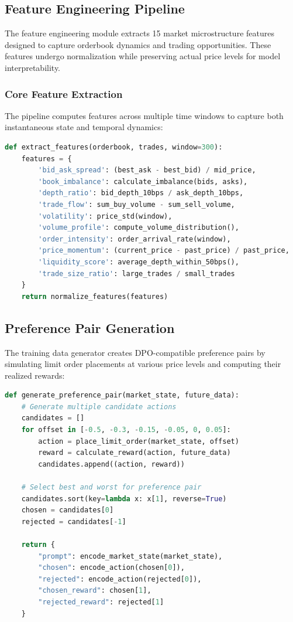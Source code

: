 \documentclass{report}
\begin{document}
\subsection{Feature Engineering Pipeline}

The feature engineering module extracts 15 market microstructure features designed to capture orderbook dynamics and trading opportunities. These features undergo normalization while preserving actual price levels for model interpretability.

\subsubsection{Core Feature Extraction}

The pipeline computes features across multiple time windows to capture both instantaneous state and temporal dynamics:

\begin{lstlisting}[language=Python, caption=Feature extraction implementation]
def extract_features(orderbook, trades, window=300):
    features = {
        'bid_ask_spread': (best_ask - best_bid) / mid_price,
        'book_imbalance': calculate_imbalance(bids, asks),
        'depth_ratio': bid_depth_10bps / ask_depth_10bps,
        'trade_flow': sum_buy_volume - sum_sell_volume,
        'volatility': price_std(window),
        'volume_profile': compute_volume_distribution(),
        'order_intensity': order_arrival_rate(window),
        'price_momentum': (current_price - past_price) / past_price,
        'liquidity_score': average_depth_within_50bps(),
        'trade_size_ratio': large_trades / small_trades
    }
    return normalize_features(features)
\end{lstlisting}

\subsection{Preference Pair Generation}

The training data generator creates DPO-compatible preference pairs by simulating limit order placements at various price levels and computing their realized rewards:

\begin{lstlisting}[language=Python, caption=Preference pair generation]
def generate_preference_pair(market_state, future_data):
    # Generate multiple candidate actions
    candidates = []
    for offset in [-0.5, -0.3, -0.15, -0.05, 0, 0.05]:
        action = place_limit_order(market_state, offset)
        reward = calculate_reward(action, future_data)
        candidates.append((action, reward))
    
    # Select best and worst for preference pair
    candidates.sort(key=lambda x: x[1], reverse=True)
    chosen = candidates[0]
    rejected = candidates[-1]
    
    return {
        "prompt": encode_market_state(market_state),
        "chosen": encode_action(chosen[0]),
        "rejected": encode_action(rejected[0]),
        "chosen_reward": chosen[1],
        "rejected_reward": rejected[1]
    }
\end{lstlisting}
\end{document}
